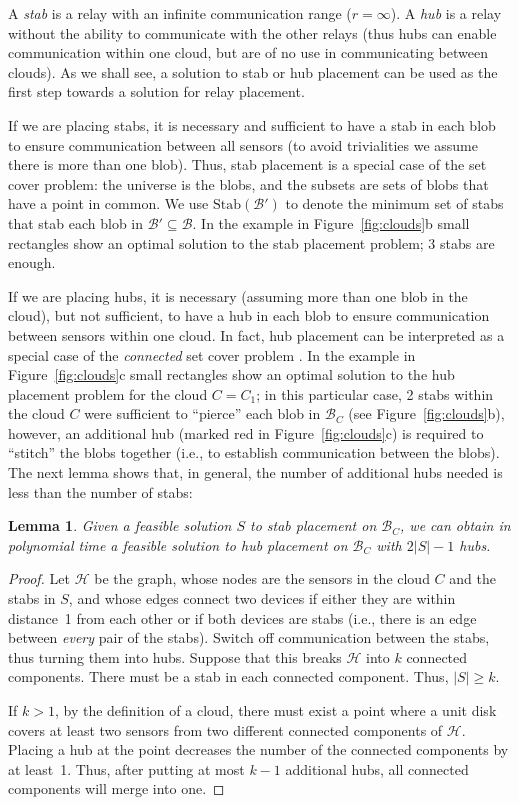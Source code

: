 \documentclass[11pt,a4paper]{article}
\newcommand{\s}[1]{{\lvert #1 \rvert}}
\newcommand{\myB}{\mathcal{B}} \newcommand{\myC}{\mathcal{C}} \newcommand{\myD}{\mathcal{D}} \newcommand{\myP}{\mathcal{P}} \newcommand{\myS}{\mathcal{S}}
\newcommand{\myH}{\mathcal{H}}
\newcommand{\optstab}{\mathrm{Stab}}
\newtheorem{lemma}{Lemma}
\theoremstyle{definition}
\theoremstyle{remark}
\begin{document}
A \emph{stab} is a relay with an infinite communication range ($r=\infty$). A \emph{hub} is a relay without the ability to communicate with the other relays (thus hubs can enable communication within one cloud, but are of no use in communicating between clouds). As we shall see, a solution to stab or hub placement can be used as the first step towards a solution for relay placement.

If we are placing stabs, it is necessary and sufficient to have a stab in each blob to ensure communication between all sensors (to avoid trivialities we assume there is more than one blob). Thus, stab placement is a special case of the set cover problem: the universe is the blobs, and the subsets are sets of blobs that have a point in common.  We use $\optstab(\myB')$ to denote the minimum set of stabs that stab each blob in $\myB' \subseteq \myB$. In the example in Figure~\ref{fig:clouds}b small rectangles show an optimal solution to the stab placement problem; 3 stabs are enough.

If we are placing hubs, it is necessary (assuming more than one blob in the cloud), but not sufficient, to have a hub in each blob to ensure communication between sensors within one cloud.  In fact, hub placement can be interpreted as a special case of the \emph{connected} set cover problem \cite{cerdeira05requiring,shuai06connected}.  In the example in Figure~\ref{fig:clouds}c small rectangles show an optimal solution to the hub placement problem for the cloud $C = C_1$; in this particular case, 2 stabs within the cloud $C$ were sufficient to ``pierce'' each blob in $\myB_C$ (see Figure~\ref{fig:clouds}b), however, an additional hub (marked red in Figure~\ref{fig:clouds}c) is required to ``stitch'' the blobs together (i.e., to establish communication between the blobs). The next lemma shows that, in general, the number of additional hubs needed  is less than the number of stabs:

\begin{lemma}\label{lem_stab2hub}
    Given a feasible solution\/ $S$ to stab placement on\/ $\myB_C$, we can obtain in polynomial time a feasible solution to hub placement on\/ $\myB_C$ with\/ $2 \s{S}-1$ hubs.
\end{lemma}

\begin{proof}
    Let $\myH$ be the graph, whose nodes are the sensors in the cloud $C$ and the stabs in $S$, and whose edges connect two devices if either they are within distance~1 from each other or if both devices are stabs (i.e., there is an edge between \emph{every} pair of the stabs).  Switch off communication between the stabs, thus turning them into hubs.  Suppose that this breaks $\myH$ into $k$ connected components. There must be a stab in each connected component. Thus, $\s{S} \ge k$.

    If $k > 1$, by the definition of a cloud, there must exist a point where a unit disk covers at least two sensors from two different connected components of $\myH$. Placing a hub at the point decreases the number of the connected components by at least~1. Thus, after putting at most $k-1$ additional hubs, all connected components will merge into one.
\end{proof}
\end{document}
